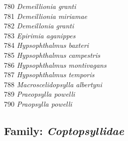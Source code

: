 \documentclass[
]{article}
\begin{document}
780 \emph{Demeillionia granti}\\
781 \emph{Demeillionia miriamae}\\
782 \emph{Demeillonia granti}\\
783 \emph{Epirimia aganippes}\\
784 \emph{Hypsophthalmus baxteri}\\
785 \emph{Hypsophthalmus campestris}\\
786 \emph{Hypsophthalmus montivagans}\\
787 \emph{Hypsophthalmus temporis}\\
788 \emph{Macroscelidopsylla albertyni}\\
789 \emph{Praeopsylla powelli}\\
790 \emph{Praopsylla powelli}

\hypertarget{family-coptopsyllidae}{%
\subsection{\texorpdfstring{Family:
\emph{Coptopsyllidae}}{Family: Coptopsyllidae}}\label{family-coptopsyllidae}}
\end{document}

